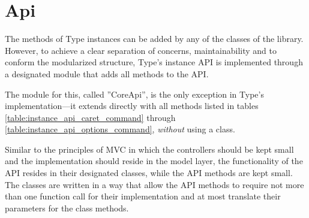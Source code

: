 

\section{Api}



The methods of Type instances can be added by any of the classes of the library. However, to achieve a clear separation of concerns, maintainability and to conform the modularized structure, Type's instance API is implemented through a designated module that adds all methods to the API.

The module for this, called ''CoreApi'', is the only exception in Type's implementation---it extends  directly with all methods listed in tables \ref{table:instance_api_caret_command} through \ref{table:instance_api_options_command}, \textit{without} using a class.

Similar to the principles of MVC in which the controllers should be kept small and the implementation should reside in the model layer, the functionality of the API resides in their designated classes, while the API methods are kept small. The classes are written in a way that allow the API methods to require not more than one function call for their implementation and at most translate their parameters for the class methods.


